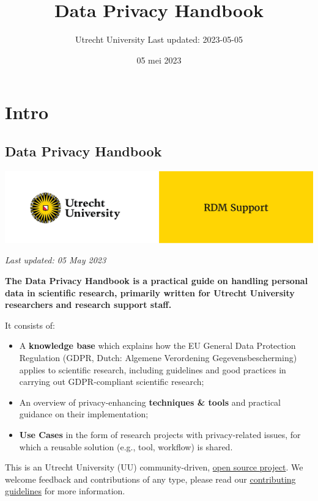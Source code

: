 \documentclass[
]{book}
\title{Data Privacy Handbook}
\author{Utrecht University \textbar{} Last updated: 2023-05-05}
\date{05 mei 2023}
\providecommand{\tightlist}{%
  \setlength{\itemsep}{0pt}\setlength{\parskip}{0pt}}
\begin{document}
\maketitle

{
\setcounter{tocdepth}{1}
\tableofcontents
}
\hypertarget{part-intro}{%
\part*{Intro}\label{part-intro}}

\hypertarget{data-privacy-handbook}{%
\chapter*{Data Privacy Handbook}\label{data-privacy-handbook}}

\includegraphics{img/cover-image-dph.png}

\emph{Last updated: 05 May 2023}

\textbf{The Data Privacy Handbook is a practical guide on handling personal data in
scientific research, primarily written for Utrecht University researchers and
research support staff.}

It consists of:

\begin{itemize}
\tightlist
\item
  A \textbf{knowledge base} which explains how the EU General Data Protection
  Regulation (GDPR, Dutch: Algemene Verordening Gegevensbescherming) applies to
  scientific research, including guidelines and good practices in carrying out
  GDPR-compliant scientific research;
\item
  An overview of privacy-enhancing \textbf{techniques \& tools} and practical guidance
  on their implementation;
\item
  \textbf{Use Cases} in the form of research projects with privacy-related issues,
  for which a reusable solution (e.g., tool, workflow) is shared.
\end{itemize}

This is an Utrecht University (UU) community-driven,
\href{https://github.com/UtrechtUniversity/dataprivacyhandbook}{open source project}.
We welcome feedback and contributions of any type, please read our
\href{https://github.com/UtrechtUniversity/dataprivacyhandbook/blob/main/CONTRIBUTING.md}{contributing guidelines}
for more information.
\end{document}
